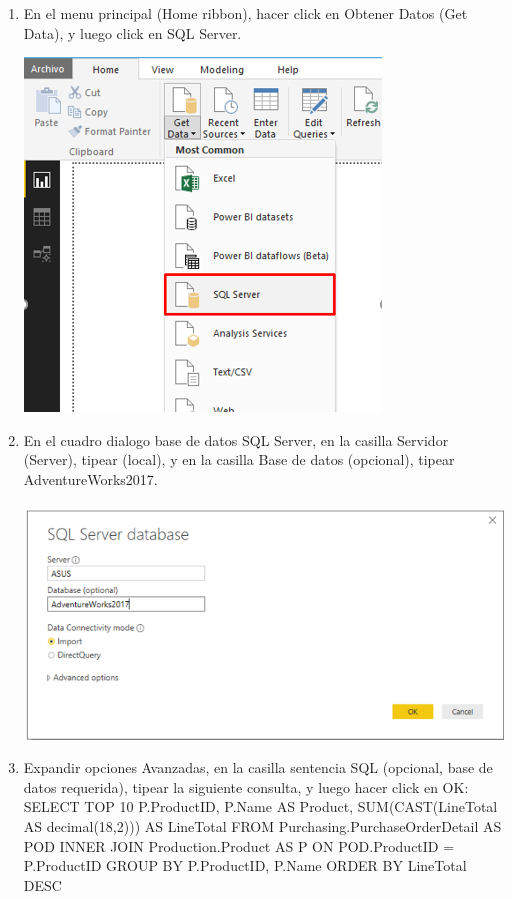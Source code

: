 \begin{itemize}
\begin{enumerate}
\item En el menu principal (Home ribbon), hacer click en Obtener Datos (Get Data), y luego click en SQL Server. 

\begin{center}
\includegraphics[scale=0.55]{./Imagenes/a11.png}
\end{center}

\item En el cuadro dialogo base de datos SQL Server, en la casilla Servidor (Server), tipear (local), y en la casilla Base de datos (opcional), tipear AdventureWorks2017.

\begin{center}
\includegraphics[scale=0.55]{./Imagenes/a12.png}
\end{center}

\item Expandir opciones Avanzadas, en la casilla sentencia SQL (opcional, base de datos requerida), tipear la
siguiente consulta, y luego hacer click en OK:
SELECT TOP 10 P.ProductID, P.Name AS Product, SUM(CAST(LineTotal AS decimal(18,2))) AS LineTotal FROM
Purchasing.PurchaseOrderDetail AS POD INNER JOIN Production.Product AS P ON POD.ProductID = P.ProductID
GROUP BY P.ProductID, P.Name ORDER BY LineTotal DESC



\end{enumerate}
\end{itemize}

